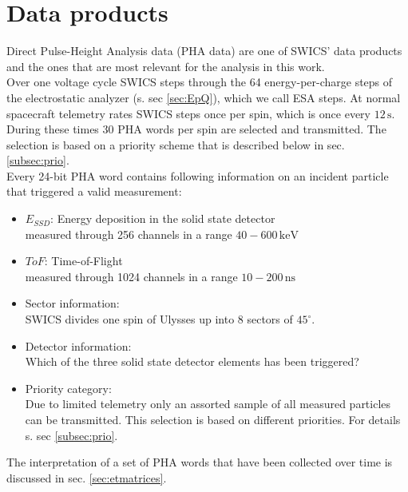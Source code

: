 \section{Data products}
Direct Pulse-Height Analysis data (PHA data) are one of SWICS' data products and the ones that are most relevant for the analysis in this work.\\
Over one voltage cycle SWICS steps through the 64 energy-per-charge steps of the electrostatic analyzer (s. sec \ref{sec:EpQ}), which we call ESA steps. At normal spacecraft telemetry rates SWICS steps once per spin, which is once every $12\,\mathrm{s}$. During these times 30 PHA words per spin are selected and transmitted. The selection is based on a priority scheme that is described below in sec. \ref{subsec:prio}.\\
Every 24-bit PHA word contains following information on an incident particle that triggered a valid measurement:
\begin{itemize}
	\item $E_{SSD}$: Energy deposition in the solid state detector \\
	measured through 256 channels in a range $40 - 600\,\mathrm{keV}$
	\item $ToF$: Time-of-Flight\\
	measured through 1024 channels in a range $10 - 200\,\mathrm{ns}$
	\item Sector information:\\
	SWICS divides one spin of Ulysses up into 8 sectors of $45^\circ$.
	\item Detector information: \\
	Which of the three solid state detector elements has been triggered?
	\item Priority category: \\
	Due to limited telemetry only an assorted sample of all measured particles can be transmitted. This selection is based on different priorities. For details s. sec \ref{subsec:prio}.
\end{itemize}
The interpretation of a set of PHA words that have been collected over time is discussed in sec. \ref{sec:etmatrices}. 
%
